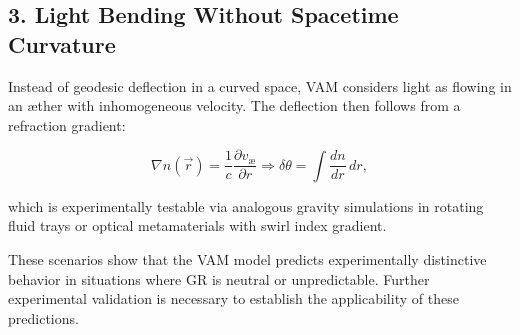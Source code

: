 \subsection*{3. Light Bending Without Spacetime Curvature}

Instead of geodesic deflection in a curved space, VAM considers light as flowing in an æther with inhomogeneous velocity. The deflection then follows from a refraction gradient:

\begin{equation}
    \nabla n(\vec{r}) = \frac{1}{c} \frac{\partial v_\text{\ae}}{\partial r} \Rightarrow \delta \theta = \int \frac{dn}{dr} \, dr,
\end{equation}

which is experimentally testable via analogous gravity simulations in rotating fluid trays or optical metamaterials with swirl index gradient.

\bigskip

These scenarios show that the VAM model predicts experimentally distinctive behavior in situations where GR is neutral or unpredictable. Further experimental validation is necessary to establish the applicability of these predictions.